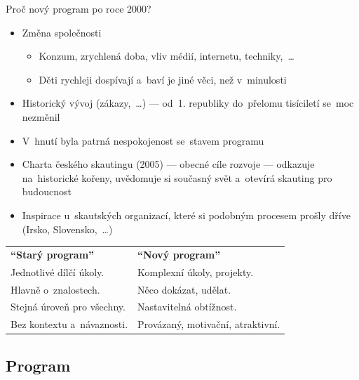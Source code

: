 \documentclass[compress, ucs, xelatex, 11pt, xcolor=dvipsnames, print, aspectratio=169,
	hyperref={
		bookmarks=true,
		unicode=true,
		colorlinks=true,
		pdftitle={Skautska vychovna metoda},
		plainpages=false,
		pdfauthor={Vojtech Zeisek},
		pdfsubject={Skautska vychovna metoda a jeji vyvoj za posledni stoleti a desetileti},
		pdfcreator={XeLaTeX},
		pdfkeywords={Junak, Pedagogika, Skaut, Skauting, Vychovna metoda},
		linkcolor=Red, %
		anchorcolor=ForestGreen, %
		citecolor=ForestGreen, %
		filecolor=ForestGreen, %
		menucolor=ForestGreen, %
		urlcolor=Sepia, %
		pdftex},
	url={hyphens, lowtilde} %
	]{beamer}
\begin{document}
\begin{frame}{Proč nový program po roce 2000?}
	\begin{itemize}
		\item Změna společnosti
		\begin{itemize}
			\item Konzum, zrychlená doba, vliv médií, internetu, techniky,~\ldots
			\item Děti rychleji dospívají a~baví je jiné věci, než v~minulosti
		\end{itemize}
		\item Historický vývoj (zákazy,~\ldots) --- od~1. republiky do~přelomu tisíciletí se~moc nezměnil
		\item V~hnutí byla patrná nespokojenost se~stavem programu
		\item Charta českého skautingu (2005) --- obecné cíle rozvoje --- odkazuje na~historické kořeny, uvědomuje si současný svět a~otevírá skauting pro budoucnost
		\item Inspirace u~skautských organizací, které si podobným procesem prošly dříve (Irsko, Slovensko,~\ldots)
	\end{itemize}
	\begin{center}
		\begin{tabular}{ll}
			\textbf{\enquote{Starý program}} & \textbf{\enquote{Nový program}}\\
			Jednotlivé dílčí úkoly. & Komplexní úkoly, projekty.\\
			Hlavně o~znalostech. & Něco dokázat, udělat.\\
			Stejná úroveň pro všechny. & Nastavitelná obtížnost.\\
			Bez kontextu a~návaznosti. & Provázaný, motivační, atraktivní.
		\end{tabular}
	\end{center}
\end{frame}

\subsection{Program}
\end{document}
